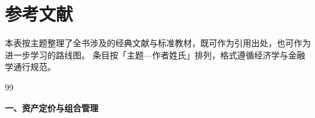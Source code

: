 \chapter{参考文献}

本表按主题整理了全书涉及的经典文献与标准教材，既可作为引用出处，也可作为进一步学习的路线图。
条目按「主题—作者姓氏」排列，格式遵循经济学与金融学通行规范。

\begin{thebibliography}{99}
\setlength{\itemsep}{1.5pt}
\setlength{\parskip}{0pt}

\item[] \textbf{一、资产定价与组合管理}


\end{thebibliography}
